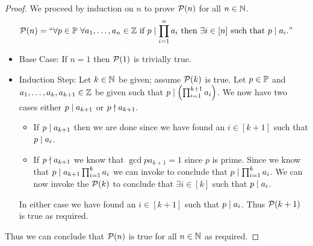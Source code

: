         \begin{proof}
            We proceed by induction on $n$ to prove $\mathcal{P}(n)$ for all $n \in \mathbb{N}$.
            \[
                \inductive{P}{n} = ``\forall p \in \set{P} \ \forall a_1, \dots, a_n \in \set{Z}
                                    \mbox{ if } \divides{p}{\prod_{i = 1}^{n} a_i} \mbox{ then } 
                                    \exists i \in [n] \mbox{ such that } \divides{p}{a_i}."
            \]
            \begin{itemize}
                \item
                    Base Case: If $n = 1$ then $\mathcal{P}(1)$ is trivially true.
                \item
                    Induction Step: Let $k \in \mathbb{N}$ be given; assume $\mathcal{P}(k)$ is
                    true. Let $p \in \mathbb{P}$ and $a_1, \dots, a_k, a_{k + 1} \in \mathbb{Z}$ be
                    given such that $p \mid \left(\prod_{i = 1}^{k + 1} a_i\right)$.
                    We now have two cases either $p \mid a_{k + 1}$ or $p \nmid a_{k + 1}$.
                    \begin{itemize}
                        \item
                            If $p \mid a_{k + 1}$ then we are done since we have found an
                            $i \in [k + 1]$ such that $p \mid a_i$.
                        \item
                            If $p \nmid a_{k + 1}$ we know that $\gcd{p}{a_{k + 1}} = 1$
                            since $p$ is prime. Since we know that $p \mid a_{k + 1} \prod_{i = 1}^{k} a_i$
                            we can invoke  to conclude that $p \mid \prod_{i = 1}^k a_i$.
                            We can now invoke the $\mathcal{P}(k)$ to conclude that $\exists i \in [k]$
                            such that $p \mid a_i$.
                    \end{itemize}
                    In either case we have found an $i \in [k + 1]$ such that $p \mid a_i$.
                    Thus $\mathcal{P}(k + 1)$ is true as required.
            \end{itemize}
            Thus we can conclude that $\mathcal{P}(n)$ is true for all $n \in \mathbb{N}$
            as required. \QED
        \end{proof}
